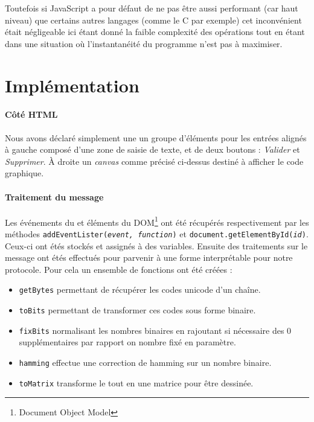 \documentclass[12pt, a4paper]{article}
\begin{document}
Toutefois si \textsf{JavaScript} a pour défaut de ne pas être aussi performant (car haut niveau) que certains autres langages (comme le \textsf{C} par exemple) cet inconvénient était négligeable ici étant donné la faible complexité des opérations tout en étant dans une situation où l'instantanéité du programme n'est pas à maximiser.

\section*{Implémentation}

\paragraph{Côté HTML} Nous avons déclaré simplement une un groupe d'éléments pour les entrées alignés à gauche composé d'une zone de saisie de texte, et de deux boutons : \emph{Valider} et \emph{Supprimer}. À droite un \emph{canvas} comme précisé ci-dessus destiné à afficher le code graphique.

\paragraph{Traitement du message} Les événements du et éléments du DOM\footnote{Document Object Model} ont été récupérés respectivement par les méthodes \texttt{addEventLister(\emph{event, function})} et \texttt{document.getElementById(\emph{id})}. Ceux-ci ont étés stockés et assignés à des variables. Ensuite des traitements sur le message ont étés effectués pour parvenir à une forme interprétable pour notre protocole. Pour cela un ensemble de fonctions ont été créées : 
\begin{itemize}
	\item \texttt{getBytes} permettant de récupérer les codes unicode d'un chaîne.
	\item \texttt{toBits} permettant de transformer ces codes sous forme binaire.
	\item \texttt{fixBits} normalisant les nombres binaires en rajoutant si nécessaire des $0$ supplémentaires par rapport on nombre fixé en paramètre.
	\item \texttt{hamming} effectue une correction de hamming sur un nombre binaire.
	\item \texttt{toMatrix} transforme le tout en une matrice pour être dessinée.
\end{itemize}
\end{document}
